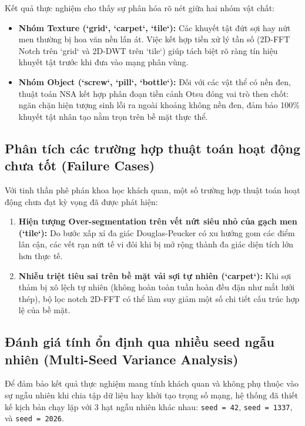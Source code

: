 Kết quả thực nghiệm cho thấy sự phân hóa rõ nét giữa hai nhóm vật chất:
\begin{itemize}
    \item \textbf{Nhóm Texture (`grid`, `carpet`, `tile`):} Các khuyết tật đứt sợi hay nứt men thường bị hoa văn nền lấn át. Việc kết hợp tiền xử lý tần số (2D-FFT Notch trên `grid` và 2D-DWT trên `tile`) giúp tách biệt rõ ràng tín hiệu khuyết tật trước khi đưa vào mạng phân vùng.
    \item \textbf{Nhóm Object (`screw`, `pill`, `bottle`):} Đối với các vật thể có nền đen, thuật toán NSA kết hợp phân đoạn tiền cảnh Otsu đóng vai trò then chốt: ngăn chặn hiện tượng sinh lỗi ra ngoài khoảng không nền đen, đảm bảo 100\% khuyết tật nhân tạo nằm trọn trên bề mặt thực thể.
\end{itemize}

\subsection{Phân tích các trường hợp thuật toán hoạt động chưa tốt (Failure Cases)}

Với tinh thần phê phán khoa học khách quan, một số trường hợp thuật toán hoạt động chưa đạt kỳ vọng đã được phát hiện:
\begin{enumerate}
    \item \textbf{Hiện tượng Over-segmentation trên vết nứt siêu nhỏ của gạch men (`tile`):} Do bước xấp xỉ đa giác Douglas-Peucker có xu hướng gom các điểm lân cận, các vết rạn nứt tế vi đôi khi bị mở rộng thành đa giác diện tích lớn hơn thực tế.
    \item \textbf{Nhiễu triệt tiêu sai trên bề mặt vải sợi tự nhiên (`carpet`):} Khi sợi thảm bị xô lệch tự nhiên (không hoàn toàn tuần hoàn đều đặn như mắt lưới thép), bộ lọc notch 2D-FFT có thể làm suy giảm một số chi tiết cấu trúc hợp lệ của bề mặt.
\end{enumerate}

\subsection{Đánh giá tính ổn định qua nhiều seed ngẫu nhiên (Multi-Seed Variance Analysis)}

Để đảm bảo kết quả thực nghiệm mang tính khách quan và không phụ thuộc vào sự ngẫu nhiên khi chia tập dữ liệu hay khởi tạo trọng số mạng, hệ thống đã thiết kế kịch bản chạy lặp với 3 hạt ngẫu nhiên khác nhau: \texttt{seed = 42}, \texttt{seed = 1337}, và \texttt{seed = 2026}. 

